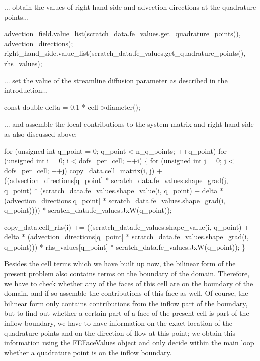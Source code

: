 ... obtain the values of right hand side and advection directions at the quadrature points...


\begin{DoxyCode}
advection\_field.value\_list(scratch\_data.fe\_values.get\_quadrature\_points(),
                           advection\_directions);
right\_hand\_side.value\_list(scratch\_data.fe\_values.get\_quadrature\_points(),
                           rhs\_values);
\end{DoxyCode}


... set the value of the streamline diffusion parameter as described in the introduction...


\begin{DoxyCode}
\textcolor{keyword}{const} \textcolor{keywordtype}{double} delta = 0.1 * cell->diameter();
\end{DoxyCode}


... and assemble the local contributions to the system matrix and right hand side as also discussed above\+:


\begin{DoxyCode}
\textcolor{keywordflow}{for} (\textcolor{keywordtype}{unsigned} \textcolor{keywordtype}{int} q\_point = 0; q\_point < n\_q\_points; ++q\_point)
    \textcolor{keywordflow}{for} (\textcolor{keywordtype}{unsigned} \textcolor{keywordtype}{int} i = 0; i < dofs\_per\_cell; ++i) \{
        \textcolor{keywordflow}{for} (\textcolor{keywordtype}{unsigned} \textcolor{keywordtype}{int} j = 0; j < dofs\_per\_cell; ++j)
            copy\_data.cell\_matrix(i, j) +=
                ((advection\_directions[q\_point] *
                  scratch\_data.fe\_values.shape\_grad(j, q\_point) *
                  (scratch\_data.fe\_values.shape\_value(i, q\_point) +
                   delta *
                       (advection\_directions[q\_point] *
                        scratch\_data.fe\_values.shape\_grad(i, q\_point)))) *
                 scratch\_data.fe\_values.JxW(q\_point));

        copy\_data.cell\_rhs(i) +=
            ((scratch\_data.fe\_values.shape\_value(i, q\_point) +
              delta * (advection\_directions[q\_point] *
                       scratch\_data.fe\_values.shape\_grad(i, q\_point))) *
             rhs\_values[q\_point] * scratch\_data.fe\_values.JxW(q\_point));
    \}
\end{DoxyCode}


Besides the cell terms which we have built up now, the bilinear form of the present problem also contains terms on the boundary of the domain. Therefore, we have to check whether any of the faces of this cell are on the boundary of the domain, and if so assemble the contributions of this face as well. Of course, the bilinear form only contains contributions from the {\ttfamily inflow} part of the boundary, but to find out whether a certain part of a face of the present cell is part of the inflow boundary, we have to have information on the exact location of the quadrature points and on the direction of flow at this point; we obtain this information using the F\+E\+Face\+Values object and only decide within the main loop whether a quadrature point is on the inflow boundary.



